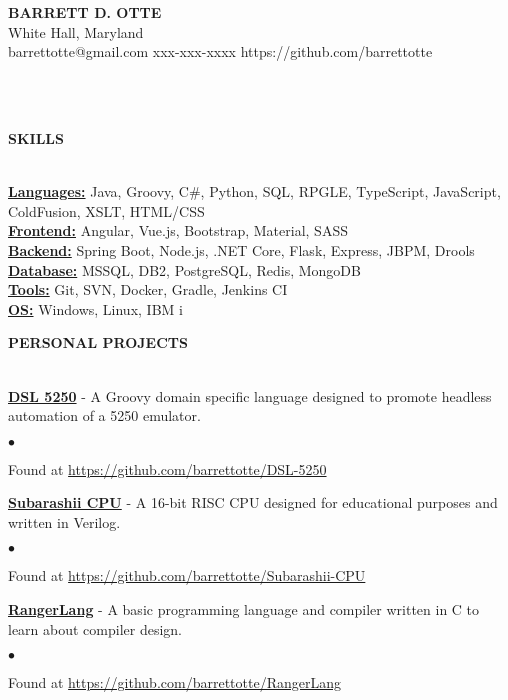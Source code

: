 \documentclass{article}
\newcommand{\lineunder}{
	\vspace*{-4pt}\\ 
	\hspace*{-18pt}\hrulefill \\
}
\newcommand{\header}[1]{
	{\hspace*{-15pt}\vspace*{6pt}\textsc{#1}}\vspace*{-6pt}\lineunder
}
\newcommand{\project}[2]{
	{\textbf{\underline{#1}} - #2{\hfill}\vspace*{3pt}}
}
\newcommand{\contact}[5]{
	\vspace*{-8pt}
	\begin{center}
		{\Large \textbf \scshape {#1}}\\
		\normalsize #2\\
		\normalsize #3 \hspace*{20pt} 
		\normalsize #4 \hspace*{20pt}
		\normalsize #5
		\lineunder
	\end{center}
	\vspace*{-8pt}
}
\newenvironment{resumecontent}{
	\begin{list}
		{\small$\bullet$}{\topsep 0pt \itemsep -2pt}}{\vspace*{4pt}
	\end{list}
}
\newcommand{\resumeheader}[1]{
	\vspace*{10pt}
	\header{\textbf{#1}}
    \vspace*{5pt}
}
\begin{document}
	\normalsize
	\smallskip
	\vspace*{-44pt}

	\contact
		{\bfseries BARRETT D. OTTE}
		{White Hall, Maryland}
		{barrettotte@gmail.com}
		{xxx-xxx-xxxx}
		{https://github.com/barrettotte}

	\resumeheader{SKILLS}
		\textbf{\underline{Languages:}}
			Java, Groovy, C\#, Python, SQL, RPGLE, TypeScript, JavaScript, ColdFusion, XSLT, HTML/CSS \\ \vspace*{5pt}
		\textbf{\underline{Frontend:}}
			Angular, Vue.js, Bootstrap, Material, SASS \\ \vspace*{5pt}
        \textbf{\underline{Backend:}}
			Spring Boot, Node.js, .NET Core, Flask, Express, JBPM, Drools \\ \vspace*{5pt}
        \textbf{\underline{Database:}}
			MSSQL, DB2, PostgreSQL, Redis, MongoDB \\ \vspace*{5pt}
		\textbf{\underline{Tools:}}
			Git, SVN, Docker, Gradle, Jenkins CI \\ \vspace*{5pt}
        \textbf{\underline{OS:}}
            Windows, Linux, IBM i

	\resumeheader{PERSONAL PROJECTS}
		\project
			{DSL 5250}
			{A Groovy domain specific language designed to promote headless automation of a 5250 emulator.}
			\begin{resumecontent}
				\item Found at \href{https://github.com/barrettotte/DSL-5250}
					{https://github.com/barrettotte/DSL-5250}
			\end{resumecontent}
            \vspace*{3pt}
		\project
			{Subarashii CPU}
			{A 16-bit RISC CPU designed for educational purposes and written in Verilog.}
            \begin{resumecontent}
				\item Found at \href{https://github.com/barrettotte/Subarashii-CPU}
					{https://github.com/barrettotte/Subarashii-CPU}
			\end{resumecontent}
            \vspace*{3pt}
		\project
			{RangerLang}
			{A basic programming language and compiler written in C to learn about compiler design.}
            \begin{resumecontent}
				\item Found at \href{https://github.com/barrettotte/RangerLang}
					{https://github.com/barrettotte/RangerLang}
			\end{resumecontent}
\end{document}
